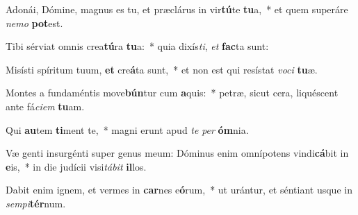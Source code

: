 \item Adonái, Dómine, magnus es tu, et præclárus in vir\textbf{tú}te \textbf{tu}a,~* et quem superáre \textit{ne}\textit{mo} \textbf{pot}est.
\item Tibi sérviat omnis crea\textbf{tú}ra \textbf{tu}a:~* quia dixís\textit{ti}, \textit{et} \textbf{fac}ta sunt:
\item Misísti spíritum tuum, \textbf{et} cre\textbf{á}ta sunt,~* et non est qui resístat \textit{vo}\textit{ci} \textbf{tu}æ.
\item Montes a fundaméntis move\textbf{bún}tur cum \textbf{a}quis:~* petræ, sicut cera, liquéscent ante fá\textit{ci}\textit{em} \textbf{tu}am.
\item Qui \textbf{au}tem \textbf{ti}ment te,~* magni erunt apud \textit{te} \textit{per} \textbf{óm}nia.
\item Væ genti insurgénti super genus meum: Dóminus enim omnípotens vindi\textbf{cá}bit in \textbf{e}is,~* in die judícii visi\textit{tá}\textit{bit} \textbf{il}los.
\item Dabit enim ignem, et vermes in \textbf{car}nes e\textbf{ó}rum,~* ut urántur, et séntiant usque in \textit{sem}\textit{pi}\textbf{tér}num.
